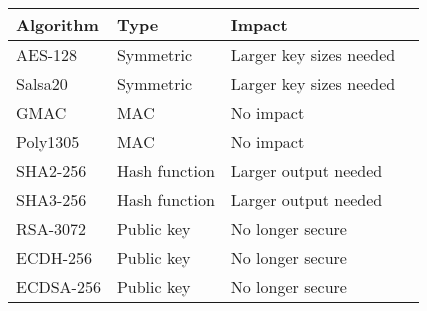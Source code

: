 \begin{tabular}{|l|l|l|l|}
  \hline
  Algorithm & Type          & Impact                  \\ \hline
  AES-128   & Symmetric     & Larger key sizes needed \\ 
  Salsa20   & Symmetric     & Larger key sizes needed \\ 
  GMAC      & MAC           & No impact               \\ 
  Poly1305  & MAC           & No impact               \\ 
  SHA2-256  & Hash function & Larger output needed    \\ 
  SHA3-256  & Hash function & Larger output needed    \\ 
  RSA-3072  & Public key    & No longer secure        \\ 
  ECDH-256  & Public key    & No longer secure        \\ 
  ECDSA-256 & Public key    & No longer secure        \\ \hline
\end{tabular}
